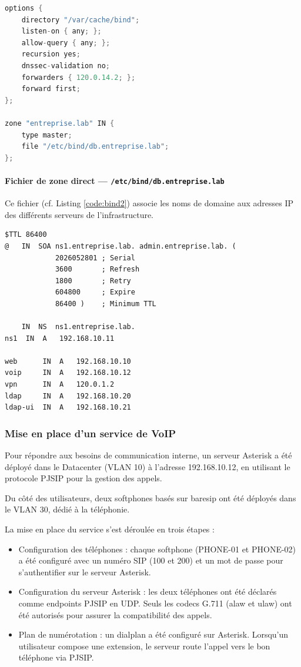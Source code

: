 \begin{lstlisting}[language=C, float=h, caption={/etc/bind/named.conf}, label={code:bind}]
options {
    directory "/var/cache/bind";
    listen-on { any; };
    allow-query { any; };
    recursion yes;
    dnssec-validation no;
    forwarders { 120.0.14.2; };
    forward first;
};

zone "entreprise.lab" IN {
    type master;
    file "/etc/bind/db.entreprise.lab";
};
\end{lstlisting}

\newpage
\paragraph{Fichier de zone direct — \texttt{/etc/bind/db.entreprise.lab}}
Ce fichier (cf. Listing \ref{code:bind2}) associe les noms de domaine aux adresses IP des différents serveurs de l'infrastructure.

\begin{lstlisting}[language=DNSZone, float=h, caption={/etc/bind/db.entreprise.lab}, label={code:bind2}]
$TTL 86400
@   IN  SOA ns1.entreprise.lab. admin.entreprise.lab. (
            2026052801 ; Serial
            3600       ; Refresh
            1800       ; Retry
            604800     ; Expire
            86400 )    ; Minimum TTL

    IN  NS  ns1.entreprise.lab.
ns1  IN  A   192.168.10.11

web      IN  A   192.168.10.10
voip     IN  A   192.168.10.12
vpn      IN  A   120.0.1.2
ldap     IN  A   192.168.10.20
ldap-ui  IN  A   192.168.10.21
\end{lstlisting}

\subsubsection{Mise en place d'un service de VoIP}

Pour répondre aux besoins de communication interne, un serveur Asterisk a été déployé dans le Datacenter (VLAN 10) à l'adresse 192.168.10.12, en utilisant le protocole PJSIP pour la gestion des appels.

Du côté des utilisateurs, deux softphones basés sur baresip ont été déployés dans le VLAN 30, dédié à la téléphonie.

La mise en place du service s'est déroulée en trois étapes :
\begin{itemize}
    \item Configuration des téléphones : chaque softphone (PHONE-01 et PHONE-02) a été configuré avec un numéro SIP (100 et 200) et un mot de passe pour s'authentifier sur le serveur Asterisk.
    \item Configuration du serveur Asterisk : les deux téléphones ont été déclarés comme endpoints PJSIP en UDP. Seuls les codecs G.711 (alaw et ulaw) ont été autorisés pour assurer la compatibilité des appels.
    \item Plan de numérotation : un dialplan a été configuré sur Asterisk. Lorsqu'un utilisateur compose une extension, le serveur route l'appel vers le bon téléphone via PJSIP.
\end{itemize}

